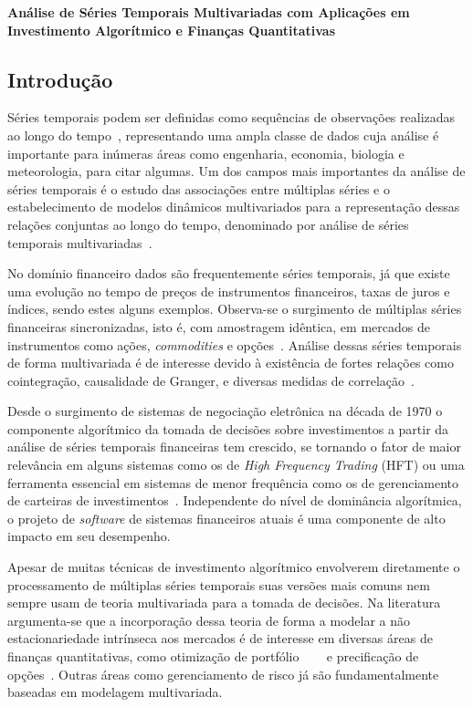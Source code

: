 \documentclass[a4paper, 12pt]{article}
\begin{document}
\textbf{\large Análise de Séries Temporais Multivariadas com Aplicações em
Investimento Algorítmico e Finanças Quantitativas}

\subsection*{Introdução}

Séries temporais podem ser definidas como sequências de observações realizadas
ao longo do tempo~\cite{chatfield}, representando uma ampla classe de dados
cuja análise é importante para inúmeras áreas como engenharia, economia,
biologia e meteorologia, para citar algumas. Um dos campos mais importantes da
análise de séries temporais é o estudo das associações entre múltiplas séries e
o estabelecimento de modelos dinâmicos multivariados para a representação
dessas relações conjuntas ao longo do tempo, denominado por análise de séries
temporais multivariadas~\cite{box}.

No domínio financeiro dados são frequentemente séries temporais, já que
existe uma evolução no tempo de preços de instrumentos financeiros, taxas de
juros e índices, sendo estes alguns exemplos. Observa-se o surgimento de
múltiplas séries financeiras sincronizadas, isto é, com amostragem idêntica, em
mercados de instrumentos como ações, \emph{commodities} e opções~\cite{tsay}.
Análise dessas séries temporais de forma multivariada é de interesse devido à
existência de fortes relações como cointegração, causalidade de Granger, e
diversas medidas de correlação~\cite{morettin}.

Desde o surgimento de sistemas de negociação eletrônica na década de 1970 o
componente algorítmico da tomada de decisões sobre investimentos a partir da
análise de séries temporais financeiras tem crescido, se tornando o fator de
maior relevância em alguns sistemas como os de \emph{High Frequency Trading}
(HFT) ou uma ferramenta essencial em sistemas de menor frequência como os de
gerenciamento de carteiras de investimentos~\cite{kissell}. Independente do
nível de dominância algorítmica, o projeto de \emph{software} de sistemas
financeiros atuais é uma componente de alto impacto em seu desempenho.

Apesar de muitas técnicas de investimento algorítmico envolverem diretamente o
processamento de múltiplas séries temporais suas versões mais comuns nem sempre
usam de teoria multivariada para a tomada de decisões. Na literatura
argumenta-se que a incorporação dessa teoria de forma a modelar a não
estacionariedade intrínseca aos mercados é de interesse em diversas áreas de
finanças quantitativas, como otimização de portfólio~\cite{procacci}
~\cite{luo}~\cite{guastaroba} e precificação de opções~\cite{chorro}. Outras
áreas como gerenciamento de risco já são fundamentalmente baseadas em modelagem
multivariada.
\end{document}
